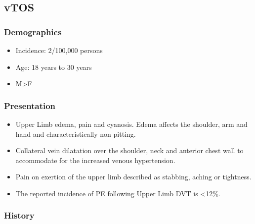 \documentclass[
]{book}
\begin{document}
\hypertarget{vtos}{%
\subsection{vTOS}\label{vtos}}

\hypertarget{demographics}{%
\subsubsection{Demographics}\label{demographics}}

\begin{itemize}
\item
  Incidence: 2/100,000 persons
\item
  Age: 18 years to 30 years
  \citep{illigComprehensiveReviewPagetSchroetter2010}
\item
  M\textgreater F
\end{itemize}

\hypertarget{presentation}{%
\subsubsection{Presentation}\label{presentation}}

\begin{itemize}
\item
  Upper Limb edema, pain and cyanosis. Edema affects the shoulder, arm
  and hand and characteristically non pitting.
\item
  Collateral vein dilatation over the shoulder, neck and anterior
  chest wall to accommodate for the increased venous hypertension.
  \citep{humphries123ThoracicOutlet2019}
\item
  Pain on exertion of the upper limb described as stabbing, aching or
  tightness.
\item
  The reported incidence of PE following Upper Limb DVT is \textless12\%.
  \citep{humphries123ThoracicOutlet2019}
\end{itemize}

\hypertarget{history}{%
\subsubsection{History}\label{history}}
\end{document}
